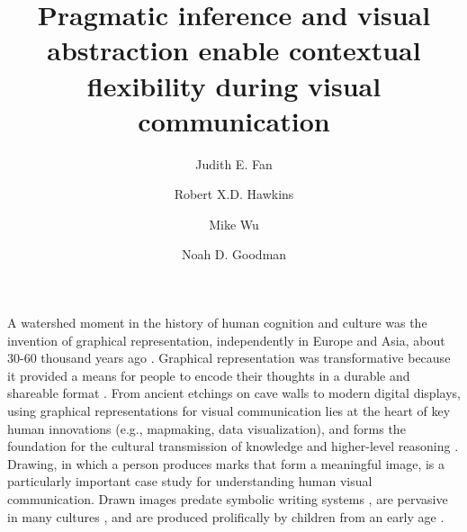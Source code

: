 \documentclass[9pt,twocolumn,twoside]{pnas-new}
\title{Pragmatic inference and visual abstraction enable contextual flexibility during visual communication}
\author[a,1]{Judith E. Fan}
\author[a]{Robert X.D. Hawkins}
\author[b]{Mike Wu}
\author[a,b]{Noah D. Goodman}
\affil[a]{Department of Psychology, Stanford University}
\affil[b]{Department of Computer Science, Stanford University}
\begin{document}
\verticaladjustment{-2pt}

\maketitle
\thispagestyle{firststyle}


\noindent A watershed moment in the history of human cognition and culture was the invention of graphical representation, independently in Europe and Asia, about 30-60 thousand years ago \cite{hoffmann2018u,Aubert:2014jy}. 
Graphical representation was transformative because it provided a means for people to encode their thoughts in a durable and shareable format \cite{donald1991origins}. 
From ancient etchings on cave walls to modern digital displays, using graphical representations for visual communication lies at the heart of key human innovations (e.g., mapmaking, data visualization), and forms the foundation for the cultural transmission of knowledge and higher-level reasoning \cite{tomasello2009cultural,card1999readings}. 
Drawing, in which a person produces marks that form a meaningful image, is a particularly important case study for understanding human visual communication. Drawn images predate symbolic writing systems \cite{clottes2008cave}, are pervasive in many cultures \cite{gombrich1989story}, and are produced prolifically by children from an early age \cite{kellogg1969analyzing}.
\end{document}
